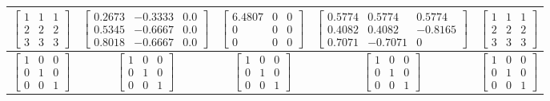 \begin{table}[h!]
{\begin{tabular}{|c|c|c|c|c|}
        $\begin{bmatrix}
        1 & 1 & 1\\
        2 & 2 & 2\\
        3 & 3 & 3
        \end{bmatrix}$ &
        $\begin{bmatrix}
        0.2673 & -0.3333 & 0.0\\
        0.5345 & -0.6667 & 0.0\\
        0.8018 & -0.6667 & 0.0
        \end{bmatrix}$ &
        $\begin{bmatrix}
        6.4807 & 0 & 0\\
        0 & 0 & 0\\
        0 & 0 & 0
        \end{bmatrix}$ &
        $\begin{bmatrix}
        0.5774 & 0.5774 & 0.5774\\
        0.4082 & 0.4082 & -0.8165\\
        0.7071 & -0.7071 & 0
        \end{bmatrix}$ &
        $\begin{bmatrix}
        1 & 1 & 1\\
        2 & 2 & 2\\
        3 & 3 & 3
        \end{bmatrix}$ \\ 
        \hline

        $\begin{bmatrix}
        1 & 0 & 0\\
        0 & 1 & 0\\
        0 & 0 & 1
        \end{bmatrix}$ &
        $\begin{bmatrix}
        1 & 0 & 0\\
        0 & 1 & 0\\
        0 & 0 & 1
        \end{bmatrix}$ &
        $\begin{bmatrix}
        1 & 0 & 0\\
        0 & 1 & 0\\
        0 & 0 & 1
        \end{bmatrix}$ &
        $\begin{bmatrix}
        1 & 0 & 0\\
        0 & 1 & 0\\
        0 & 0 & 1
        \end{bmatrix}$ &
        $\begin{bmatrix}
        1 & 0 & 0\\
        0 & 1 & 0\\
        0 & 0 & 1
        \end{bmatrix}$ \\ 
        \hline


\end{tabular}}
\end{table}

